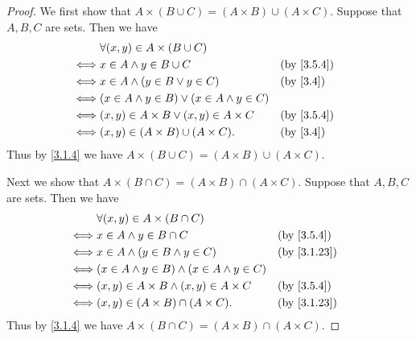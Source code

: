 \begin{proof}
  We first show that \(A \times (B \cup C) = (A \times B) \cup (A \times C)\).
  Suppose that \(A, B, C\) are sets.
  Then we have
  \begin{align*}
         & \forall (x, y) \in A \times (B \cup C)                                           \\
    \iff & x \in A \land y \in B \cup C                         &  & \by{3.5.4}             \\
    \iff & x \in A \land (y \in B \lor y \in C)                 &  & \text{(by \cref{3.4})} \\
    \iff & (x \in A \land y \in B) \lor (x \in A \land y \in C)                             \\
    \iff & (x, y) \in A \times B \lor (x, y) \in A \times C     &  & \by{3.5.4}             \\
    \iff & (x, y) \in (A \times B) \cup (A \times C).           &  & \text{(by \cref{3.4})}
  \end{align*}
  Thus by \cref{3.1.4} we have \(A \times (B \cup C) = (A \times B) \cup (A \times C)\).

  Next we show that \(A \times (B \cap C) = (A \times B) \cap (A \times C)\).
  Suppose that \(A, B, C\) are sets.
  Then we have
  \begin{align*}
         & \forall (x, y) \in A \times (B \cap C)                                               \\
    \iff & x \in A \land y \in B \cap C                          &  & \by{3.5.4}                \\
    \iff & x \in A \land (y \in B \land y \in C)                 &  & \text{(by \cref{3.1.23})} \\
    \iff & (x \in A \land y \in B) \land (x \in A \land y \in C)                                \\
    \iff & (x, y) \in A \times B \land (x, y) \in A \times C     &  & \by{3.5.4}                \\
    \iff & (x, y) \in (A \times B) \cap (A \times C).            &  & \text{(by \cref{3.1.23})}
  \end{align*}
  Thus by \cref{3.1.4} we have \(A \times (B \cap C) = (A \times B) \cap (A \times C)\).


\end{proof}
